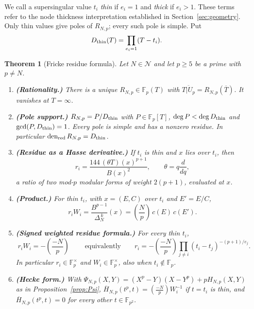 \documentclass[11pt,a4paper]{article}
\numberwithin{equation}{section}
\newtheorem{maintheorem}[theorem]{Theorem}
\theoremstyle{definition}
\theoremstyle{remark}
\newcommand{\Fp}{\mathbb F_p}
\newcommand{\Fq}{\mathbb F_{p^2}}
\newcommand{\den}{\operatorname{den}_{\mathrm{red}}}
\newcommand{\Lp}[1]{\left(\frac{#1}{p}\right)}
\begin{document}
We call a supersingular value $t_i$ \emph{thin} if $e_i=1$
and \emph{thick} if $e_i>1$. These terms refer to the node
thickness interpretation established in Section~\ref{sec:geometry}.
Only thin values give poles of $R_{N,p}$; every such pole is simple.
Put
\[
D_{\rm thin}(T)=\prod_{e_i=1}(T-t_i).
\]

\begin{maintheorem}[Fricke residue formula]\label{thm:main}
Let $N\in\mathcal N$ and let $p\ge5$ be a prime with $p\ne N$.
\begin{enumerate}[label=\textup{(\alph*)}]
\item \textbf{(Rationality.)} There is a unique $R_{N,p}\in\Fp(T)$ with $\overline{T|U_p}=R_{N,p}(\overline T)$. It vanishes at $T=\infty$.
\item \textbf{(Pole support.)} $R_{N,p}=P/D_{\rm thin}$ with $P\in\Fp[T]$,
$\deg P<\deg D_{\rm thin}$ and $\gcd(P,D_{\rm thin})=1$. Every pole is simple and has a nonzero residue. In particular $\den R_{N,p}=D_{\rm thin}$.
\item \textbf{(Residue as a Hasse derivative.)} If $t_i$ is thin and $x$ lies over $t_i$, then
\[
r_i=\frac{144\,(\theta T)(x)^{p+1}}{B(x)^2},\qquad \theta=q\frac{d}{dq},
\]
a ratio of two mod-$p$ modular forms of weight $2(p+1)$, evaluated at $x$.
\item \textbf{(Product.)} For thin $t_i$, with $x=(E,C)$ over $t_i$ and $E'=E/C$,
\[
r_iW_i=\frac{B^{p-1}}{\Delta_N^{\,k}}(x)=\Lp{N}\,c(E)\,c(E').
\]
\item \textbf{(Signed weighted residue formula.)} For every thin $t_i$,
\[
\boxed{\;r_iW_i=-\Lp{-N}\;}\qquad\text{equivalently}\qquad
r_i=-\Lp{-N}\prod_{j\ne i}(t_i-t_j)^{-(p+1)/e_j}.
\]
In particular $r_i\in\Fp^\times$ and $W_i\in\Fp^\times$, also when $t_i\notin\Fp$.
\item \textbf{(Hecke form.)} With $\Psi_{N,p}(X,Y)=(X^p-Y)(X-Y^p)+pH_{N,p}(X,Y)$ as in
Proposition~\ref{prop:Psi}, $\overline H_{N,p}(t^p,t)=\Lp{-N}W_i^{-1}$ if $t=t_i$ is thin, and
$\overline H_{N,p}(t^p,t)=0$ for every other $t\in\Fq$.
\end{enumerate}
\end{maintheorem}
\end{document}
